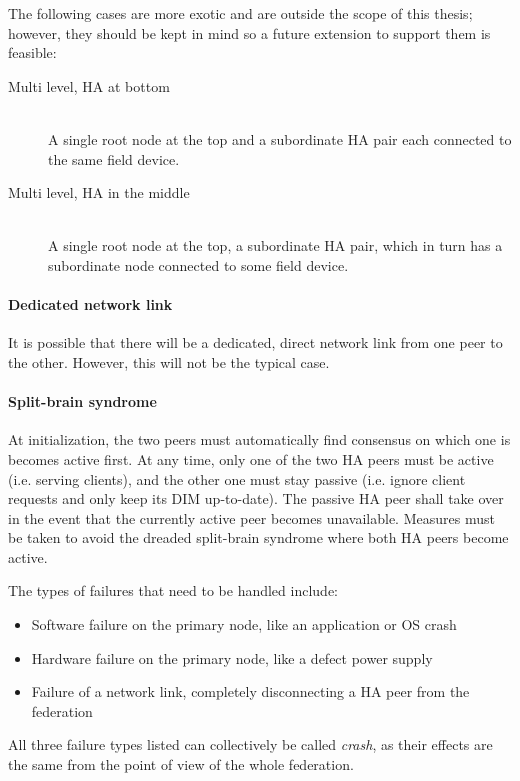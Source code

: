 The following cases are more exotic and are outside the scope of this thesis;
however, they should be kept in mind so a future extension to support them is
feasible:

\begin{description}
	\item [ Multi level, \gls{HA} at bottom ] \hfill\\
	A single root node at the top and a subordinate HA pair each connected
	to the same field device.

	\item [ Multi level, \gls{HA} in the middle ] \hfill\\
	A single root node at the top, a subordinate HA pair, which in turn has
	a subordinate node connected to some field device.
\end{description}


\paragraph{Dedicated network link}
It is possible that there will be a dedicated, direct network link from one peer to
the other. However, this will not be the typical case.

\paragraph{Split-brain syndrome}
At initialization, the two peers must automatically find consensus on which one
is becomes active first.  At any time, only one of the two HA peers must be
active (i.e. serving clients), and the other one must stay passive (i.e. ignore
client requests and only keep its DIM up-to-date). The passive HA peer shall
take over in the event that the currently active peer becomes unavailable.
Measures must be taken to avoid the dreaded split-brain syndrome where both HA
peers become active.

The types of failures that need to be handled include:
\begin{itemize}
	\item Software failure on the primary node, like an application or OS crash
	\item Hardware failure on the primary node, like a defect power supply
	\item Failure of a network link, completely disconnecting a HA peer from the federation
\end{itemize}

All three failure types listed can collectively be called \emph{crash},
as their effects are the same from the point of view of the whole federation.


